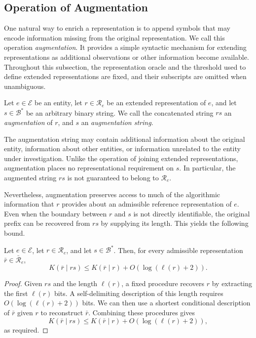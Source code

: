 
\subsection*{Operation of Augmentation}

One natural way to enrich a representation is to append symbols that may encode information missing from the original representation. We call this operation \emph{augmentation}. It provides a simple syntactic mechanism for extending representations as additional observations or other information become available. Throughout this subsection, the representation oracle and the threshold used to define extended representations are fixed, and their subscripts are omitted when unambiguous.

\begin{definition}
Let $e\in\mathcal E$ be an entity, let $r\in\mathcal R_e$ be an extended representation of $e$, and let $s\in\mathcal B^\ast$ be an arbitrary binary string. We call the concatenated string $rs$ an \emph{augmentation} of $r$, and $s$ an \emph{augmentation string}.
\end{definition}

The augmentation string may contain additional information about the original entity, information about other entities, or information unrelated to the entity under investigation. Unlike the operation of joining extended representations, augmentation places no representational requirement on $s$. In particular, the augmented string $rs$ is not guaranteed to belong to $\mathcal R_e$.

Nevertheless, augmentation preserves access to much of the algorithmic information that $r$ provides about an admissible reference representation of $e$. Even when the boundary between $r$ and $s$ is not directly identifiable, the original prefix can be recovered from $rs$ by supplying its length. This yields the following bound.

\begin{proposition}
Let $e\in\mathcal E$, let $r\in\mathcal R_e$, and let $s\in\mathcal B^\ast$. Then, for every admissible representation $\bar r\in\bar{\mathcal R}_e$,
\[
K(\bar r\mid rs)
\leq K(\bar r\mid r)+O(\log(\ell(r)+2)).
\]
\end{proposition}
\begin{proof}
Given $rs$ and the length $\ell(r)$, a fixed procedure recovers $r$ by extracting the first $\ell(r)$ bits. A self-delimiting description of this length requires $O(\log(\ell(r)+2))$ bits. We can then use a shortest conditional description of $\bar r$ given $r$ to reconstruct $\bar r$. Combining these procedures gives
\[
K(\bar r\mid rs)
\leq K(\bar r\mid r)+O(\log(\ell(r)+2)),
\]
as required.
\end{proof}

